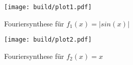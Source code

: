 \begin{figure}
    \centering
    \texttt{[image: build/plot1.pdf]}
    \caption{Fouriersynthese für $f_1(x)=|sin(x)|$}
    \label{fig:FS_sin}
\end{figure}

\begin{figure}
    \centering
    \texttt{[image: build/plot2.pdf]}
    \caption{Fouriersynthese für $f_2(x)=x$}
    \label{fig:FS_x}
\end{figure}
